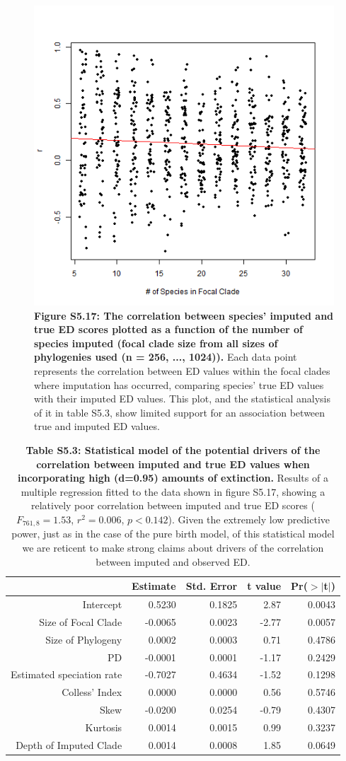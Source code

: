 \documentclass[10pt,english]{article}
\begin{document}
\begin{figure}[!ht]
  \center
  \includegraphics[width=.5\textwidth]{../figures/edModelHighExtinction.png}
  \caption{\textbf{Figure S5.17: The correlation between species' imputed and
      true ED scores plotted as a function of the number of species imputed
      (focal clade size from all sizes of phylogenies used (n = 256, ...,
      1024)).} Each data point represents the correlation between ED values
      within the focal clades where imputation has occurred, comparing species'
      true ED values with their imputed ED values. This plot, and the
      statistical analysis of it in table S5.3, show limited support for an
      association between true and imputed ED values.}
\end{figure}

\begin{table}[ht]
  \centering
  \begin{tabular}{rrrrr}
    \hline
    & Estimate & Std. Error & t value & Pr($>$$|$t$|$) \\
    \hline
    Intercept & 0.5230 & 0.1825 & 2.87 & 0.0043 \\
    Size of Focal Clade & -0.0065 & 0.0023 & -2.77 & 0.0057 \\
    Size of Phylogeny & 0.0002 & 0.0003 & 0.71 & 0.4786 \\
    PD & -0.0001 & 0.0001 & -1.17 & 0.2429 \\
    Estimated speciation rate & -0.7027 & 0.4634 & -1.52 & 0.1298 \\
    Colless' Index & 0.0000 & 0.0000 & 0.56 & 0.5746 \\
    Skew & -0.0200 & 0.0254 & -0.79 & 0.4307 \\
    Kurtosis & 0.0014 & 0.0015 & 0.99 & 0.3237 \\
    Depth of Imputed Clade & 0.0014 & 0.0008 & 1.85 & 0.0649 \\
    \hline
\end{tabular}
\caption{\textbf{Table S5.3: Statistical model of the potential drivers of the
    correlation between imputed and true ED values when incorporating high
    (d=0.95) amounts of extinction.} Results of a multiple regression fitted to
    the data shown in figure S5.17, showing a relatively poor correlation
    between imputed and true ED scores ($F_{761,8} = 1.53$, $r^{2} = 0.006$, $p
    < 0.142$). Given the extremely low predictive power, just as in the case of
    the pure birth model, of this statistical model we are reticent to make
    strong claims about drivers of the correlation between imputed and observed
    ED.}
\end{table}
\end{document}
